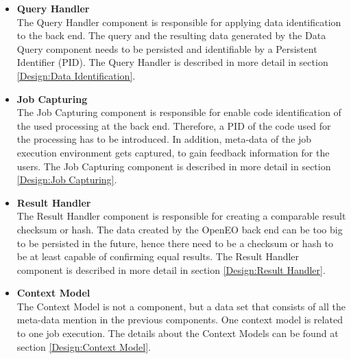 \documentclass[draft,final]{vutinfth} %
\begin{document}
 \begin{itemize}
	\item \textbf{Query Handler} \\
	The Query Handler component is responsible for applying data identification to the back end. The query and the resulting data generated by the Data Query component needs to be persisted and identifiable by a Persistent Identifier (PID). The Query Handler is described in more detail in section \ref{Design:Data Identification}.     
	\item \textbf{Job Capturing} \\ 
	The Job Capturing component is responsible for enable code identification of the used processing at the back end. Therefore, a PID of the code used for the processing has to be introduced. In addition, meta-data of the job execution environment gets captured, to gain feedback information for the users. The Job Capturing component is described in more detail in section \ref{Design:Job Capturing}.
	\item \textbf{Result Handler} \\
	The Result Handler component is responsible for creating a comparable result checksum or hash. The data created by the OpenEO back end can be too big to be persisted in the future, hence there need to be a checksum or hash to be at least capable of confirming equal results. The Result Handler component is described in more detail in section \ref{Design:Result Handler}.   
	\item \textbf{Context Model} \\ 
	The Context Model is not a component, but a data set that consists of all the meta-data mention in the previous components. One context model is related to one job execution. The details about the Context Models can be found at section \ref{Design:Context Model}. 
\end{itemize}
\end{document}
